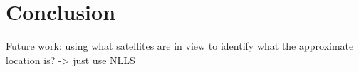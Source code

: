 
\def\chapdir{./ChapterConclusion}
\chapter{Conclusion}\label{ch:conclusion}

Future work:
using what satellites are in view to identify what the approximate location is? -> just use NLLS
